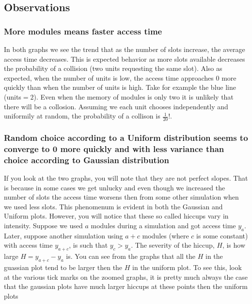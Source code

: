 \documentclass[12pt]{article}
\begin{document}
\subsection*{Observations}
\subsubsection*{More modules means faster access time}
In both graphs we see the trend that as the number of slots increase,
the average access time decreases. This is expected behavior as more slots
available decreases the probability of a collision (two units requesting the same slot). Also
as expected, when the number of units is low, the access time approaches 0 
more quickly than when the number of units is high. Take for example the blue line (units$=2$). Even when the memory of modules is only two it is unlikely that there will be a collosion.
Assuming we each unit chooses independently and uniformily at random, the probability of a collison is $\frac1{20}$!. 

\subsubsection*{Random choice according to a Uniform distribution seems to converge to 0 more quickly and with less variance than choice according to Gaussian distribution }

If you look at the two graphs, you will note that they are not perfect slopes. 
That is because in some cases we get unlucky and even though we increased the number of slots
the access time worsens then from some other simulation when we used less slots. This phenomenum is evident in both the Gaussian and Uniform plots. However, you will notice that
these so called hiccups vary in intensity. Suppose we used $a$ modules during a simulation and got access time $y_a$. Later, suppose another simulation using $a+c$ modules (where $c$
is some constant) with access time $y_{a+c}$, is such that $y_c > y_a$. The severity
of the hiccup, $H$, is how large $H = y_{a+c} - y_{a}$ is. You can see from the graphs
that all the $H$ in the guassian plot tend to be larger then the $H$ in the 
uniform plot. To see this, look at the various tick marks on the zoomed graphs, it is 
pretty much always the case that the gaussian plots have much larger hiccups at these points
then the uniform plots
\end{document}
